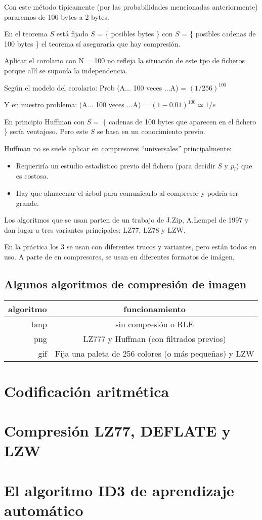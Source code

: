 	Con este método típicamente (por las probabilidades mencionadas anteriormente) pararemos de 100 bytes a 2 bytes.

	En el teorema $S$ está fijado $S$ = \{ posibles bytes \} con $S$ = \{ posibles cadenas de 100 bytes \} el teorema sí aseguraría que hay compresión.

	\begin{obs} Aplicar el corolario con N = 100 no refleja la situación de este tpo de ficheros porque allí se suponía la independencia.

	Según el modelo del corolario: Prob (A... 100 veces ...A) = $(1/256)^{100}$

	Y en nuestro problema: (A... 100 veces ...A) = $(1 - 0.01)^{100} \simeq{1/e}$

	\end{obs}

	En principio Huffman con $S =$ \{ cadenas de 100 bytes que aparecen en el fichero \} sería ventajoso. Pero este $S$ se basa en un conocimiento previo.

	Huffman no se suele aplicar en compresores ``universales'' principalmente:

	\begin{itemize}
		\item Requeriría un estudio estadístico previo del fichero (para decidir $S$ y $p_i$) que es costosa.

		\item Hay que almacenar el árbol para comunicarlo al compresor y podría ser grande.

	\end{itemize}

	Los algoritmos que se usan parten de un trabajo de J.Zip, A.Lempel de 1997 y dan lugar a tres variantes principales: LZ77, LZ78 y LZW.

	En la práctica los 3 se usan con diferentes trucos y variantes, pero están todos en uso. A parte de en compresores, se usan en diferentes formatos de imágen.

	\subsection{Algunos algoritmos de compresión de imagen}

		\begin{table}[h]
			\centering
			\begin{tabular}{r|c}
			algoritmo & funcionamiento \\ \hline
			bmp & sin compresión o RLE \\
			png & LZ777 y Huffman (con filtrados previos) \\
			gif & Fija una paleta de 256 colores (o más pequeñas) y LZW \\
			\end{tabular}
		\end{table}


\section{Codificación aritmética}
\section{Compresión LZ77, DEFLATE y LZW}
\section{El algoritmo ID3 de aprendizaje automático}

